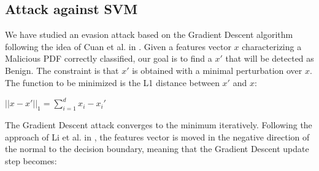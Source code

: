 \documentclass[twocolumn, switch]{article} %
\begin{document}
\subsection{Attack against SVM}
\label{subsec:svm}
We have studied an evasion attack based on the Gradient Descent algorithm following the idea of Cuan et al. in \cite{cuan_damien_delaplace_valois_2018}. Given
a features vector $x$ characterizing a Malicious PDF correctly classified, our goal is to find a $x'$ that will be detected as Benign. The constraint is that $x'$ is obtained with a minimal perturbation over $x$. The function to be minimized is the L1 distance between $x'$ and $x$:
\begin{center}
	$||x-x'||_1 = \sum_{i=1}^{d}x_i-x_i'$
\end{center}

The Gradient Descent attack converges to the minimum iteratively. Following the approach of Li et al. in \cite{li_liu_yan_yang_2022}, the features vector is moved in the negative direction of the normal to the decision boundary, meaning that the Gradient Descent update step becomes:
\end{document}
